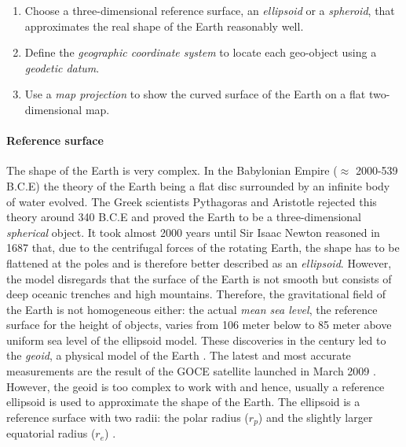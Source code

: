 \begin{enumerate}
  \item Choose a three-dimensional reference surface, an \emph{ellipsoid} or a \emph{spheroid}, that approximates the real shape of the Earth reasonably well.
  \item Define the \emph{geographic coordinate system} to locate each geo-object using a \emph{geodetic datum}.
  \item Use a \emph{map projection} to show the curved surface of the Earth on a flat two-dimensional map.
\end{enumerate}

\paragraph{Reference surface} %
\label{par:reference_surface}

The shape of the Earth is very complex.
In the Babylonian Empire ($\approx$ 2000-539 B.C.E) the theory of the Earth being a flat disc surrounded by an infinite body of water evolved.
The Greek scientists Pythagoras and Aristotle rejected this theory around 340 B.C.E and proved the Earth to be a three-dimensional \emph{spherical} object.
It took almost 2000 years until Sir Isaac Newton reasoned in 1687 that, due to the centrifugal forces of the rotating Earth, the shape has to be flattened at the poles and is therefore better described as an \emph{ellipsoid}.
However, the model disregards that the surface of the Earth is not smooth but consists of deep oceanic trenches and high mountains. Therefore, the gravitational field of the Earth is not homogeneous either: the actual \emph{mean sea level}, the reference surface for the height of objects, varies from 106 meter below to 85 meter above uniform sea level of the ellipsoid model. These discoveries in the  century led to the \emph{geoid}, a physical model of the Earth
\cite{geoid}.
The latest and most accurate measurements are the result of the GOCE satellite launched in March 2009 \cite{geoidESRI}.
However, the geoid is too complex to work with and hence, usually a reference ellipsoid is used to approximate the shape of the Earth. The ellipsoid is a reference surface with two radii: the polar radius ($r_p$) and the slightly larger equatorial radius ($r_e$) \cite[pp. 69-77]{bolstad2008gis}.

